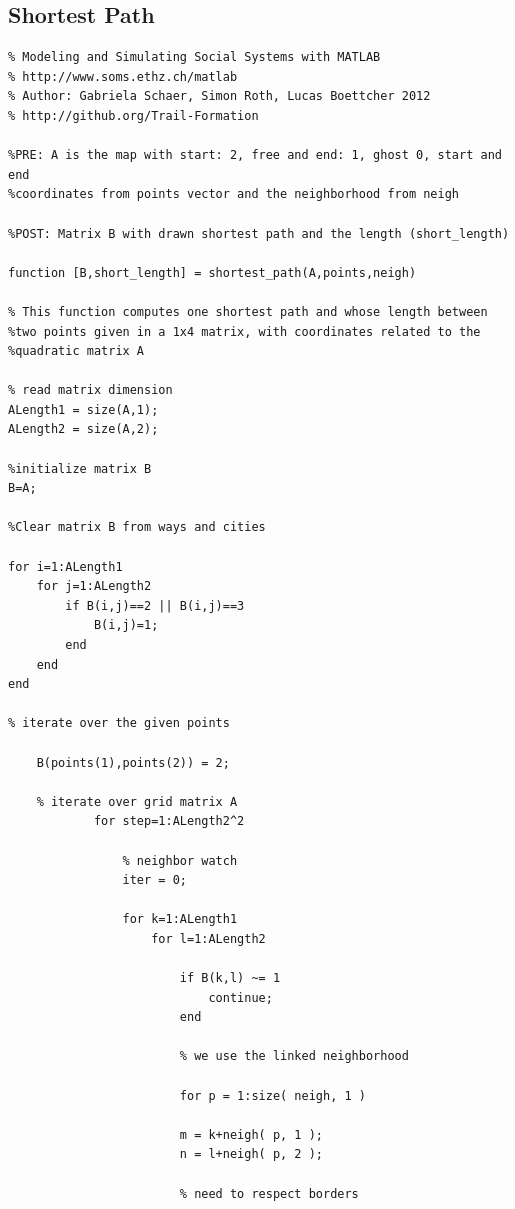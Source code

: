 \documentclass[11pt]{scrartcl}
\begin{document}
\subsection{Shortest Path}
\begin{verbatim}
% Modeling and Simulating Social Systems with MATLAB
% http://www.soms.ethz.ch/matlab
% Author: Gabriela Schaer, Simon Roth, Lucas Boettcher 2012
% http://github.org/Trail-Formation

%PRE: A is the map with start: 2, free and end: 1, ghost 0, start and end
%coordinates from points vector and the neighborhood from neigh

%POST: Matrix B with drawn shortest path and the length (short_length)

function [B,short_length] = shortest_path(A,points,neigh)

% This function computes one shortest path and whose length between
%two points given in a 1x4 matrix, with coordinates related to the
%quadratic matrix A

% read matrix dimension
ALength1 = size(A,1);
ALength2 = size(A,2);

%initialize matrix B
B=A;

%Clear matrix B from ways and cities

for i=1:ALength1
    for j=1:ALength2
        if B(i,j)==2 || B(i,j)==3
            B(i,j)=1;
        end
    end
end

% iterate over the given points

    B(points(1),points(2)) = 2;

    % iterate over grid matrix A
            for step=1:ALength2^2
                
                % neighbor watch
                iter = 0;
                
                for k=1:ALength1
                    for l=1:ALength2
                                                    
                        if B(k,l) ~= 1
                            continue;
                        end
                        
                        % we use the linked neighborhood
                        
                        for p = 1:size( neigh, 1 )

                        m = k+neigh( p, 1 );
                        n = l+neigh( p, 2 );
                    
                        % need to respect borders
                        

\end{verbatim}
\end{document}
